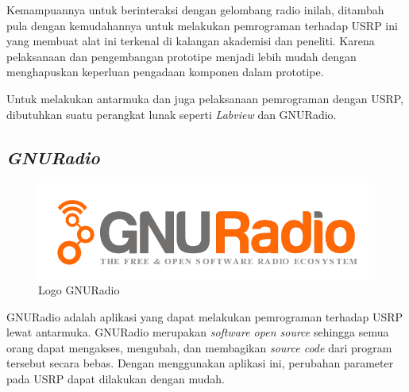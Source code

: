 Kemampuannya untuk berinteraksi dengan gelombang radio inilah, ditambah pula dengan kemudahannya untuk melakukan pemrograman terhadap USRP ini yang membuat alat ini terkenal di kalangan akademisi dan peneliti. Karena pelaksanaan dan pengembangan prototipe menjadi lebih mudah dengan menghapuskan keperluan pengadaan komponen dalam prototipe.

Untuk melakukan antarmuka dan juga pelaksanaan pemrograman dengan USRP, dibutuhkan suatu perangkat lunak seperti \textit{Labview} dan GNURadio.

\subsection{\textit{GNURadio}}

\begin{figure}
	\begin{center}
		\includegraphics[scale=0.5]{pics/bab2/GNU.png} 
		\caption[Logo GNURadio]{Logo GNURadio}
		\label{pic:logoGnuRadio}
	\end{center}
\end{figure}
GNURadio adalah aplikasi yang dapat melakukan pemrograman terhadap USRP lewat antarmuka. GNURadio merupakan \textit{software open source} sehingga semua orang dapat mengakses, mengubah, dan membagikan \textit{source code} dari program tersebut secara bebas. Dengan menggunakan aplikasi ini, perubahan parameter pada USRP dapat dilakukan dengan mudah.

